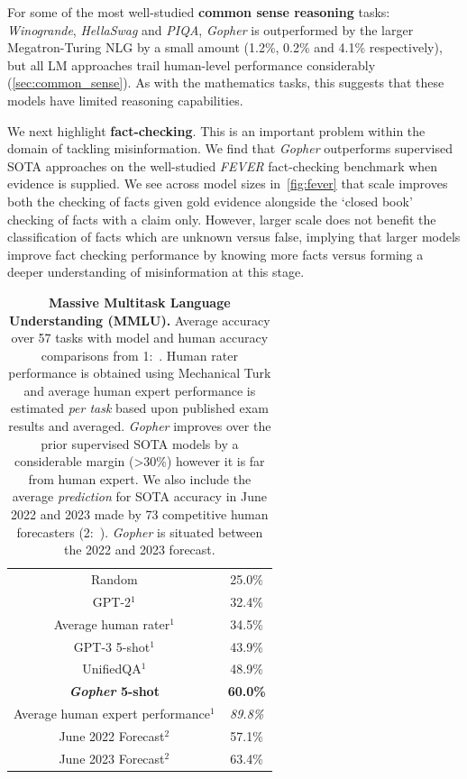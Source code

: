 \documentclass[11pt, a4paper, logo, internal, copyright, nonumbering]{deepmind}
\newcommand{\gopher}{\textit{Gopher}\xspace}
\begin{document}
For some of the most well-studied \textbf{common sense reasoning} tasks: \textit{Winogrande}, \textit{HellaSwag} and \textit{PIQA}, \gopher is outperformed by the larger Megatron-Turing NLG by a small amount (1.2\%, 0.2\% and 4.1\% respectively), but all LM approaches trail human-level performance considerably (\autoref{sec:common_sense}).  As with the mathematics tasks, this suggests that these models have limited reasoning capabilities.


We next highlight \textbf{fact-checking}. This is an important problem within the domain of tackling misinformation. We find that \gopher outperforms supervised SOTA approaches on the well-studied \textit{FEVER} fact-checking benchmark when evidence is supplied. We see across model sizes in~\autoref{fig:fever} that scale improves both the checking of facts given gold evidence alongside the `closed book' checking of facts with a claim only. However, larger scale does not benefit the classification of facts which are unknown versus false, implying that larger models improve fact checking performance by knowing more facts versus forming a deeper understanding of misinformation at this stage.


\begin{table}[t]
    \centering
    \begin{tabular}{cc}
    \toprule
        Random & 25.0\% \\
        GPT-2$^1$ &  32.4\% \\
        Average human rater$^1$ & 34.5\% \\
        GPT-3 5-shot$^1$ & 43.9\% \\
        UnifiedQA$^1$   & 48.9\% \\ 
        \textbf{\gopher 5-shot} & \textbf{60.0\%} \\
        Average human expert performance$^1$ & \textit{89.8\%} \\
        \midrule
        June 2022 Forecast$^2$& 57.1\% \\
        June 2023 Forecast$^2$& 63.4\% \\
         \bottomrule
    \end{tabular}
    \caption{\textbf{Massive Multitask Language Understanding (MMLU).} Average accuracy over 57 tasks with model and human accuracy comparisons from 1:~\citet{hendrycks2020measuring}. Human rater performance is obtained using Mechanical Turk and average human expert performance is estimated \textit{per task} based upon published exam results and averaged. \gopher improves over the prior supervised SOTA models by a considerable margin (>30\%) however it is far from human expert. We also include the average \textit{prediction} for SOTA accuracy in June 2022 and 2023 made by 73 competitive human forecasters (2:~\citet{forecast_blog}). \gopher is situated between the 2022 and 2023 forecast.}
    \label{tab:mmlu}
\end{table}
\end{document}
